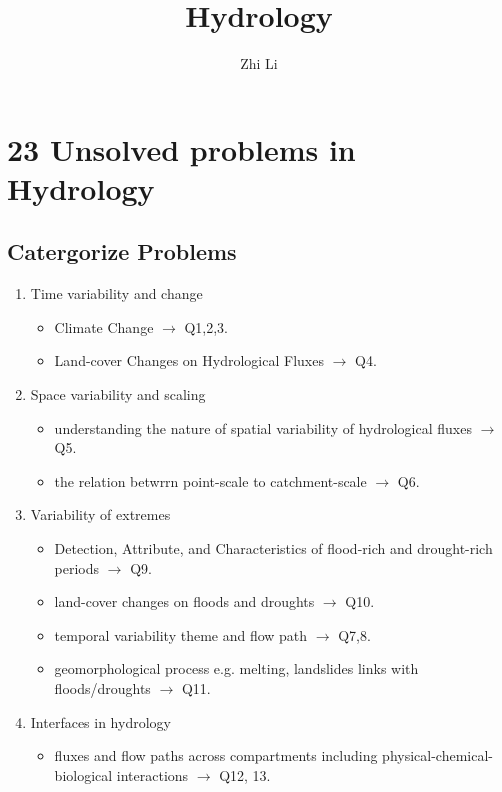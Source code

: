 \documentclass{article}
\begin{document}
\title{Hydrology}
\author{Zhi Li}
\maketitle

\section{23 Unsolved problems in Hydrology}
\subsection{Catergorize Problems}
    \begin{enumerate}
        \item Time variability and change
        \begin{itemize}
            \item Climate Change $\rightarrow$ Q1,2,3.
            \item Land-cover Changes on Hydrological Fluxes $\rightarrow$ Q4.
        \end{itemize}
        \item Space variability and scaling
        \begin{itemize}
            \item understanding the nature of spatial variability of hydrological fluxes $\rightarrow$ Q5.
            \item the relation betwrrn point-scale to catchment-scale $\rightarrow$ Q6.
        \end{itemize}
        \item Variability of extremes
        \begin{itemize}
            \item Detection, Attribute, and Characteristics of flood-rich and drought-rich periods $\rightarrow$ Q9.
            \item land-cover changes on floods and droughts $\rightarrow$ Q10.
            \item temporal variability theme and flow path $\rightarrow$ Q7,8.
            \item geomorphological process e.g. melting, landslides links with floods/droughts $\rightarrow$ Q11.
        \end{itemize}
        \item Interfaces in hydrology
        \begin{itemize}
            \item fluxes and flow paths across compartments including physical-chemical-biological interactions $\rightarrow$ Q12, 13.

\end{itemize}
\end{enumerate}
\end{document}
